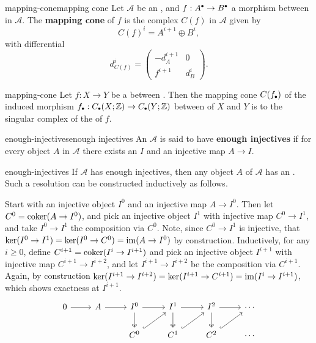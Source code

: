 \begin{topic}{mapping-cone}{mapping cone}
    Let $\mathcal{A}$ be an , and $f : A^\bdot \to B^\bdot$ a morphism between  in $\mathcal{A}$. The \textbf{mapping cone} of $f$ is the complex $C(f)$ in $\mathcal{A}$ given by
    \[ C(f)^i = A^{i + 1} \oplus B^i , \]
    with differential
    \[ d_{C(f)}^i = \begin{pmatrix} -d_A^{i + 1} & 0 \\ f^{i + 1} & d_B^i \end{pmatrix} . \]    
\end{topic}

\begin{example}{mapping-cone}
    Let $f : X \to Y$ be a  between . Then the mapping cone $C(f_\bdot)$ of the induced morphism $f_\bdot : C_\bdot(X; \ZZ) \to C_\bdot(Y; \ZZ)$ between  of $X$ and $Y$ is  to the singular complex of the  of $f$.
\end{example}

\begin{topic}{enough-injectives}{enough injectives}
    An  $\mathcal{A}$ is said to have \textbf{enough injectives} if for every object $A$ in $\mathcal{A}$ there exists an  $I$ and an injective map $A \to I$.
\end{topic}

\begin{example}{enough-injectives}
    If $\mathcal{A}$ has enough injectives, then any object $A$ of $\mathcal{A}$ has an . Such a resolution can be constructed inductively as follows.
    
    Start with an injective object $I^0$ and an injective map $A \to I^0$. Then let $C^0 = \operatorname{coker} (A \to I^0)$, and pick an injective object $I^1$ with injective map $C^0 \to I^1$, and take $I^0 \to I^1$ the composition via $C^0$. Note, since $C^0 \to I^1$ is injective, that $\ker (I^0 \to I^1) = \ker(I^0 \to C^0) = \operatorname{im} (A \to I^0)$ by construction. Inductively, for any $i \ge 0$, define $C^{i + 1} = \operatorname{coker}(I^i \to I^{i + 1})$ and pick an injective object $I^{i + 1}$ with injective map $C^{i + 1} \to I^{i + 2}$, and let $I^{i + 1} \to I^{i + 2}$ be the composition via $C^{i + 1}$. Again, by construction $\ker (I^{i + 1} \to I^{i + 2}) = \ker (I^{i + 1} \to C^{i + 1}) = \operatorname{im} (I^i \to I^{i + 1})$, which shows exactness at $I^{i + 1}$.
    \[ \begin{tikzcd}
        0 \arrow{r} & A \arrow{r} & I^0 \arrow[twoheadrightarrow]{d} \arrow{r} & I^1 \arrow[twoheadrightarrow]{d} \arrow{r} & I^2 \arrow[twoheadrightarrow]{d} \arrow{r} & \cdots \\
        & & C^0 \arrow[hookrightarrow]{ur} & C^1 \arrow[hookrightarrow]{ur} & C^2 \arrow[hookrightarrow]{ur} & \cdots
    \end{tikzcd} \]
\end{example}

